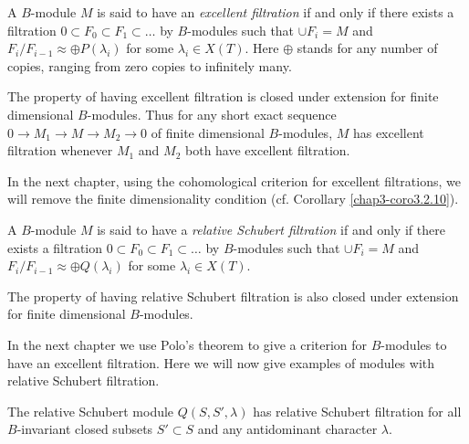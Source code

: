 \begin{definition}\label{chap2-defi2.3.6}
A $B$-module $M$ is said to have an {\em excellent
  filtration} if and 
only if there exists a filtration $0\subset F_{0}\subset
F_{1}\subset\ldots$ by $B$-modules such that $\cup F_{i}=M$ and
$F_{i}/F_{i-1}\approx \oplus P(\lambda_{i})$ for some $\lambda_{i}\in
X(T)$. Here $\oplus$ stands for any number of copies, ranging from
zero copies to infinitely many.
\end{definition}

\begin{remark}\label{chap2-rem2.3.7}
The property of having excellent filtration is closed under extension
for finite dimensional $B$-modules. Thus for any short exact sequence
$0\to M_{1}\to M\to M_{2}\to 0$ of finite dimensional $B$-modules, $M$
has excellent filtration whenever $M_{1}$ and $M_{2}$ both have
excellent filtration.
\end{remark}

In the next chapter, using the cohomological criterion for excellent
filtrations, we will remove the finite dimensionality condition (cf.\@
Corollary \ref{chap3-coro3.2.10}). 

\begin{definition}\label{chap2-defi2.3.8}
A $B$-module $M$ is said to have a 
{\em relative Schubert filtration}
if and only if there exists a filtration $0\subset F_{0}\subset
F_{1}\subset \ldots$ by $B$-modules such that $\cup F_{i}=M$ and
$F_{i}/F_{i-1}\approx \oplus Q(\lambda_{i})$ for some $\lambda_{i}\in
X(T)$. 
\end{definition}

\begin{remark}\label{chap2-rem2.3.9}
The property of having relative Schubert filtration is also closed
under extension for finite dimensional $B$-modules.
\end{remark}

In the next chapter we use Polo's theorem to give a criterion for
$B$-modules to have an excellent filtration. Here we will now give
examples of modules with relative Schubert filtration.

\begin{lemma}\label{chap2-lem2.3.10}
The relative Schubert module $Q(S,S',\lambda)$ has relative Schubert
filtration for all $B$-invariant closed subsets $S'\subset S$ and any
antidominant character $\lambda$.
\end{lemma}

